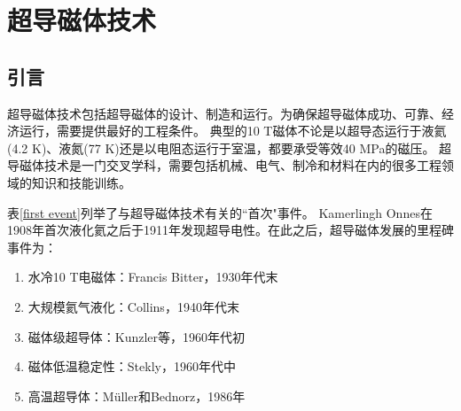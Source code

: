 \chapter{超导磁体技术}
\section{引言}
超导磁体技术包括超导磁体的设计、制造和运行。为确保超导磁体成功、可靠、经济运行，需要提供最好的工程条件。
典型的10 T磁体不论是以超导态运行于液氦(4.2 K)、液氮(77 K)还是以电阻态运行于室温，都要承受等效40 MPa的磁压。
超导磁体技术是一门交叉学科，需要包括机械、电气、制冷和材料在内的很多工程领域的知识和技能训练。

表\ref{first event}列举了与超导磁体技术有关的``首次"事件。
Kamerlingh Onnes在1908年首次液化氦之后于1911年发现超导电性。在此之后，超导磁体发展的里程碑事件为：
\begin{enumerate}
  \item 水冷10 T电磁体：Francis Bitter，1930年代末
  \item 大规模氦气液化：Collins，1940年代末
  \item 磁体级超导体：Kunzler等，1960年代初
  \item 磁体低温稳定性：Stekly，1960年代中
  \item 高温超导体：Müller和Bednorz，1986年
\end{enumerate}

